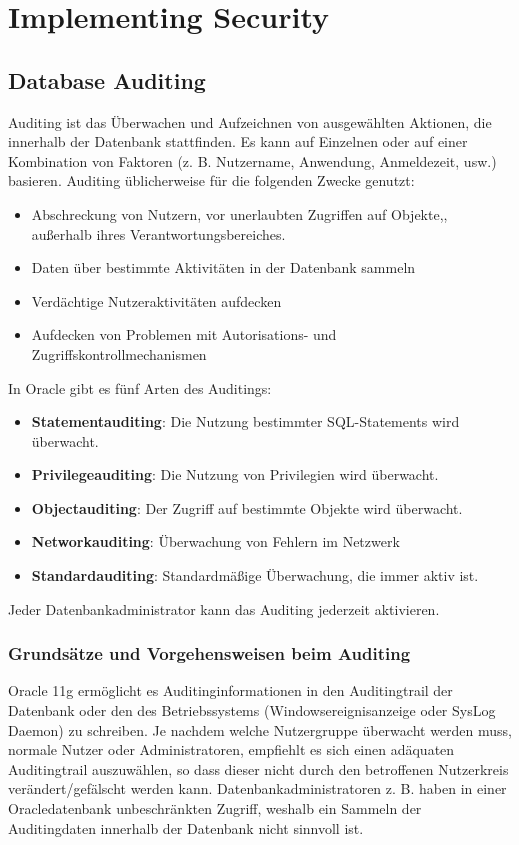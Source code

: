   \chapter{Implementing Security}
    \setcounter{page}{1}
    \minitoc
\newpage
    \section{Database Auditing}
      Auditing ist das \"Uberwachen und Aufzeichnen von ausgew\"ahlten Aktionen,
      die innerhalb der Datenbank stattfinden. Es kann auf Einzelnen oder auf
      einer Kombination von Faktoren (z. B. Nutzername, Anwendung, Anmeldezeit,
      usw.) basieren. Auditing \"ublicherweise f\"ur die folgenden Zwecke
      genutzt:
      \begin{itemize}
        \item Abschreckung von Nutzern, vor unerlaubten Zugriffen auf Objekte,,
        au\ss erhalb ihres Verantwortungsbereiches.
        \item Daten \"uber bestimmte Aktivit\"aten in der Datenbank sammeln
        \item Verd\"achtige Nutzeraktivit\"aten aufdecken
        \item Aufdecken von Problemen mit Autorisations- und Zugriffskontrollmechanismen
      \end{itemize}
      In Oracle gibt es f\"unf Arten des Auditings:
      \begin{itemize}
        \item \textbf{Statementauditing}: Die Nutzung bestimmter SQL-Statements wird \"uberwacht.
        \item \textbf{Privilegeauditing}: Die Nutzung von Privilegien wird \"uberwacht.
        \item \textbf{Objectauditing}: Der Zugriff auf bestimmte Objekte wird \"uberwacht.
        \item \textbf{Networkauditing}: \"Uberwachung von Fehlern im Netzwerk
        \item \textbf{Standardauditing}: Standardm\"a\ss{}ige \"Uberwachung, die immer aktiv ist.
      \end{itemize}
      \begin{merke}
        Jeder Datenbankadministrator kann das Auditing jederzeit aktivieren.
      \end{merke}
      \subsection{Grunds\"atze und Vorgehensweisen beim Auditing}
        Oracle 11g erm\"oglicht es Auditinginformationen in den Auditingtrail
        der Datenbank oder den des Betriebssystems (Windowsereignisanzeige oder
        SysLog Daemon) zu schreiben. Je nachdem welche Nutzergruppe \"uberwacht
        werden muss, normale Nutzer oder Administratoren, empfiehlt es sich
        einen ad\"aquaten Auditingtrail auszuw\"ahlen, so dass dieser nicht
        durch den betroffenen Nutzerkreis ver\"andert/gef\"alscht werden kann.
        Datenbankadministratoren z. B. haben in einer Oracledatenbank
        unbeschränkten Zugriff, weshalb ein Sammeln der Auditingdaten innerhalb
        der Datenbank nicht sinnvoll ist.
